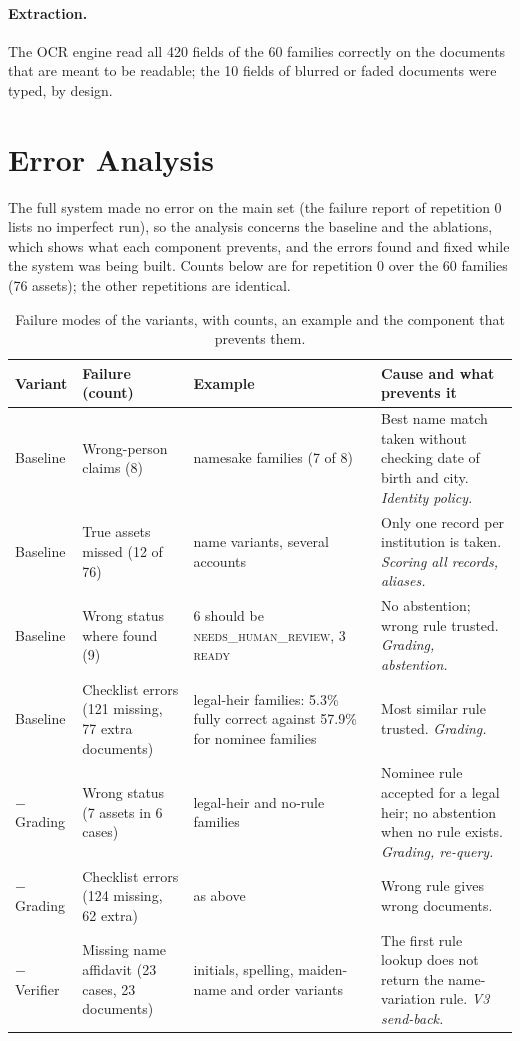 \documentclass[12pt,a4paper,oneside]{report}
\begin{document}
\paragraph{Extraction.} The OCR engine read all 420 fields of the 60 families correctly on the documents that are meant to be readable; the 10 fields of blurred or faded documents were typed, by design.

\section{Error Analysis}
The full system made no error on the main set (the failure report of repetition 0 lists no imperfect run), so the analysis concerns the baseline and the ablations, which shows what each component prevents, and the errors found and fixed while the system was being built. Counts below are for repetition 0 over the 60 families (76 assets); the other repetitions are identical.

\begin{table}[H]
\centering\footnotesize{}
\caption[Failure modes of the variants]{Failure modes of the variants, with counts, an example and the component that prevents them.}\label{tab:errors}
\renewcommand{\arraystretch}{1.1}
\begin{tabularx}{\linewidth}{@{}p{1.7cm}p{3.1cm}p{3.6cm}X@{}}
\toprule
\textbf{Variant} & \textbf{Failure (count)} & \textbf{Example} & \textbf{Cause and what prevents it} \\ \midrule
Baseline & Wrong-person claims (8) & namesake families (7 of 8) & Best name match taken without checking date of birth and city. \emph{Identity policy.} \\
Baseline & True assets missed (12 of 76) & name variants, several accounts & Only one record per institution is taken. \emph{Scoring all records, aliases.} \\
Baseline & Wrong status where found (9) & 6 should be \textsc{needs\_human\_review}, 3 \textsc{ready} & No abstention; wrong rule trusted. \emph{Grading, abstention.} \\
Baseline & Checklist errors (121 missing, 77 extra documents) & legal-heir families: 5.3\% fully correct against 57.9\% for nominee families & Most similar rule trusted. \emph{Grading.} \\
$-$Grading & Wrong status (7 assets in 6 cases) & legal-heir and no-rule families & Nominee rule accepted for a legal heir; no abstention when no rule exists. \emph{Grading, re-query.} \\
$-$Grading & Checklist errors (124 missing, 62 extra) & as above & Wrong rule gives wrong documents. \\
$-$Verifier & Missing name affidavit (23 cases, 23 documents) & initials, spelling, maiden-name and order variants & The first rule lookup does not return the name-variation rule. \emph{V3 send-back.} \\ \bottomrule
\end{tabularx}
\end{table}
\end{document}
